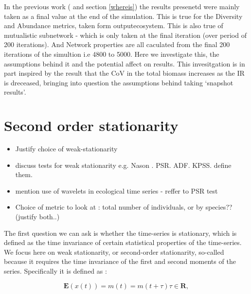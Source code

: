 In the previous work (\cite{lurgi2015effects} and section \ref{whereis}) the results presenetd were mainly taken as a final value at the end of the simulation. This is true for the Diversity and Abundance metrics, taken form outputecosystem. This is also true of mutualistic subnetwork - which is only taken at the final iteration (over period of 200 iterations). And Network properties are all caculated from the final 200 iterations of the simultion i.e 4800 to 5000. Here we investigate this, the assumptions behind it and the potential affect on results. This invesitgation is in part inspired by the result that the CoV in the total biomass increases as the IR is dreceased, bringing into question the assumptions behind taking `snapshot results'.



\section{Second order stationarity}

\begin{itemize}
	\item Justify choice of weak-stationarity
	\item discuss tests for weak stationarity e.g. Nason \cite{ref:nason2013test}. PSR. ADF. KPSS. define them.
	\item mention use of wavelets in ecological time series - reffer to PSR test 		
	\item Choice of metric to look at : total number of individuals, or by species?? (justify both..)
\end{itemize}

The first question we can ask is whether the time-series is stationary, which is defined as the time invariance of certain statistical properties of the time-series. We focus here on weak stationarity, or second-order stationarity, so-called because it requires the time invariance of the first and second moments of the series. Specifically it is defined as \cite{BOOKONDESK}:

\begin{equation}
	\mathbf{E}(x(t)) = m(t) = m(t + \tau)  \tau \in \mathbf{R},
\end{equation}

